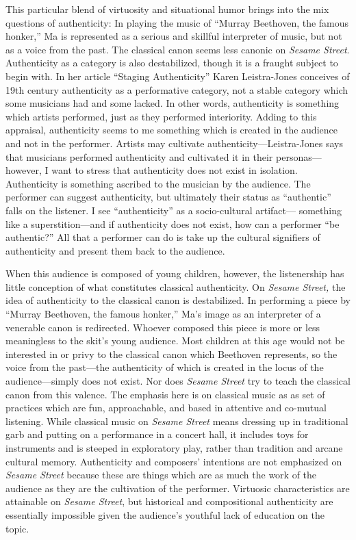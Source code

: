 \documentclass[12pt,letterpaper]{article}
\newcommand{\ses}{\textit{Sesame Street }}
\begin{document}
	This particular blend of virtuosity and situational
	humor brings into the mix questions of authenticity: In playing the
	music of ``Murray Beethoven, the famous honker,'' Ma is represented as a
	serious and skillful interpreter of music, but not as a voice from the 
	past. The classical canon seems less canonic on \textit{Sesame Street}.
	Authenticity as a category is also destabilized, though it is a fraught 	subject to begin with. 
        In her article ``Staging Authenticity'' Karen Leistra-Jones conceives of
	19th century authenticity as a performative category, not a stable 
	category which some musicians had and some 
	lacked.\autocite[400]{Jones2013} In other words, authenticity is 
	something which artists performed, just as they performed interiority. 
	Adding to this appraisal, authenticity seems to me something which is 
	created in the audience and not in the performer. Artists may cultivate
	authenticity---Leistra-Jones says that musicians performed authenticity
	and cultivated it in their personas---however, I want to stress that 
	authenticity does not exist in isolation. Authenticity is something 
	ascribed to the musician by the audience. The performer can suggest 
	authenticity, but ultimately their status as ``authentic'' falls on the 
	listener. I see ``authenticity'' as a socio-cultural artifact---
	something like a superstition---and if authenticity does not exist, how 
	can a performer ``be authentic?'' All that a performer can do is take 
	up the cultural signifiers of authenticity and present them back to the 
	audience.

        When this audience is composed of young children, however, the 
	listenership has little conception of what constitutes classical 
	authenticity. On \textit{Sesame Street,} the idea of authenticity to the
	classical canon is destabilized. In performing a piece by ``Murray 
	Beethoven, the famous honker,'' Ma's image as an interpreter of a 
	venerable canon is redirected. Whoever composed this piece is more or 
	less meaningless to the skit's young audience. Most children at this age
	would not be interested in or privy to the classical canon which 
	Beethoven 
	represents, so the voice from the past---the authenticity of which is 
	created in the locus of the audience---simply does not exist. Nor does 
	\textit{Sesame Street} try to teach the classical canon from this 
	valence. The emphasis here is on 
	classical music as as set of practices which are fun, approachable, and 	based in attentive and co-mutual listening. While classical music on 
	\ses means
	dressing up in traditional garb and putting on a performance in a 
	concert hall, it includes toys for instruments and is steeped in 
	exploratory play, rather than tradition and arcane cultural memory. 
	Authenticity and composers' 
	intentions are not emphasized on \textit{Sesame Street} because these 
	are things which are as much the work of the audience as they are the 
	cultivation of the performer. Virtuosic characteristics 
	are attainable on \textit{Sesame Street}, but historical and 
	compositional authenticity are essentially impossible given the 
	audience's youthful lack of education on the topic. 
	
\end{document}
